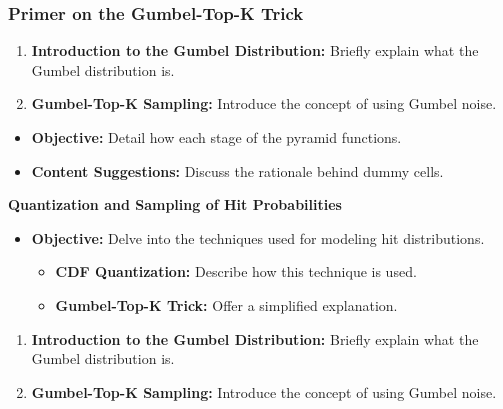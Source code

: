 \begin{frame}[t]
\frametitle{Primer on the Gumbel-Top-K Trick}

\begin{enumerate}
\item \textbf{Introduction to the Gumbel Distribution:} Briefly explain what the Gumbel distribution is.
\item \textbf{Gumbel-Top-K Sampling:} Introduce the concept of using Gumbel noise.
\end{enumerate}
\end{frame}

\begin{frame}[t]
\begin{itemize}
\item \textbf{Objective:} Detail how each stage of the pyramid functions.
\item \textbf{Content Suggestions:} Discuss the rationale behind dummy cells.
\end{itemize}

\par\medskip\noindent\textbf{Quantization and Sampling of Hit Probabilities}\par


\begin{itemize}
\item \textbf{Objective:} Delve into the techniques used for modeling hit distributions.
\begin{itemize}
\item \textbf{CDF Quantization:} Describe how this technique is used.
\item \textbf{Gumbel-Top-K Trick:} Offer a simplified explanation.
\end{itemize}
\end{itemize}


\begin{enumerate}
\item \textbf{Introduction to the Gumbel Distribution:} Briefly explain what the Gumbel distribution is.
\item \textbf{Gumbel-Top-K Sampling:} Introduce the concept of using Gumbel noise.
\end{enumerate}
\end{frame}

